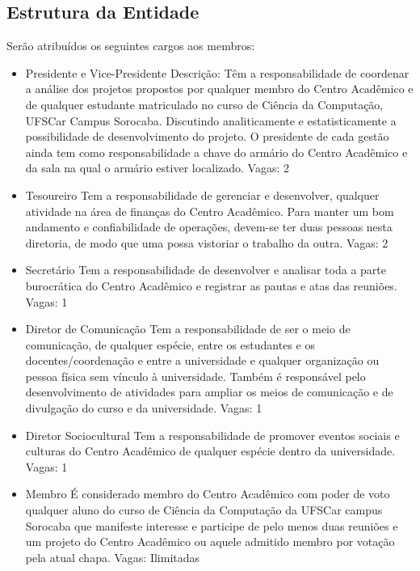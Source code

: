 \documentclass[12pt]{article}
\begin{document}
\subsection*{Estrutura da Entidade}
Serão atribuídos os seguintes cargos aos membros:
\begin{itemize}
    \item Presidente e Vice-Presidente
        \subitem Descrição: Têm a responsabilidade de coordenar a
        análise dos projetos propostos por qualquer membro do Centro Acadêmico
        e de qualquer estudante matriculado no curso de Ciência da Computação,
        UFSCar Campus Sorocaba. Discutindo analiticamente e estatisticamente a
        possibilidade de desenvolvimento do projeto.
        \subitem O presidente de cada gestão ainda tem como responsabilidade a chave do
        armário do Centro Acadêmico e da sala na qual o armário estiver
        localizado.
        \subitem Vagas: 2
    \item Tesoureiro
        \subitem Tem a responsabilidade de gerenciar e desenvolver, qualquer
        atividade na área de finanças do Centro Acadêmico. Para manter um bom
        andamento e confiabilidade de operações, devem-se ter duas pessoas
        nesta diretoria, de modo que uma possa vistoriar o trabalho da outra.
        \subitem Vagas: 2

    \item Secretário
        \subitem Tem a responsabilidade de desenvolver e analisar toda a parte
        burocrática do Centro Acadêmico e registrar as pautas e atas das
        reuniões.
        \subitem Vagas: 1

    \item Diretor de Comunicação
        \subitem Tem a responsabilidade de ser o meio de comunicação, de
        qualquer espécie, entre os estudantes e os docentes/coordenação e entre
        a universidade e qualquer organização ou pessoa física sem vínculo à
        universidade. Também é responsável pelo desenvolvimento de atividades
        para ampliar os meios de comunicação e de divulgação do curso e da
        universidade.
        \subitem Vagas: 1

    \item Diretor Sociocultural
        \subitem Tem a responsabilidade de promover eventos sociais e culturas
        do Centro Acadêmico de qualquer espécie dentro da universidade.
        \subitem Vagas: 1

    \item Membro
        \subitem É considerado membro do Centro Acadêmico com poder de voto
        qualquer aluno do curso de Ciência da Computação da UFSCar campus
        Sorocaba que manifeste interesse e participe de pelo menos duas
        reuniões e um projeto do Centro Acadêmico ou aquele admitido membro por
        votação pela atual chapa.
        \subitem Vagas: Ilimitadas


\end{itemize}
\end{document}
